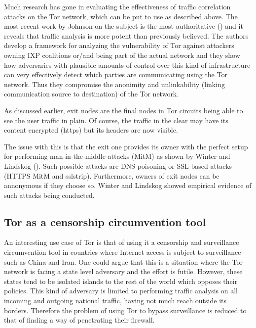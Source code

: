 \documentclass[11pt]{book} %
\begin{document}
Much research has gone in evaluating the effectiveness of traffic correlation attacks on the Tor network, which can be put to use as described above. The most recent work by Johnson on the subject is the most authoritative (\citep*{captainJohnson}) and it reveals that traffic analysis is more potent than previously believed. The authors develop a framework for analyzing the vulnerability of Tor against attackers owning IXP coalitions or/and being part of the actual network and they show how adversaries with plausible amounts of control over this kind of infrastructure can very effectively detect which parties are communicating using the Tor network. Thus they compromise the anonimity and unlinkability (linking communication source to destination) of the Tor network.


As discussed earlier, exit nodes are the final nodes in Tor circuits being able to see the user traffic in plain. Of course, the traffic in the clear may have its content encrypted (https) but its headers are now visible.

The issue with this is that the exit one provides its owner with the perfect setup for performing man-in-the-middle-attacks (MitM) as shown by Winter and Lindskog (\citep*{spoiledOnions}). Such possible attacks are DNS poisoning or SSL-based attacks (HTTPS MitM and sslstrip). Furthermore, owners of exit nodes can be annonymous if they choose so. Winter and Lindskog showed empirical evidence of such attacks being conducted.

\subsection{Tor as a censorship circumvention tool}

An interesting use case of Tor is that of using it a censorship and surveillance circumvention tool in countries where Internet access is subject to surveillance such as China and Iran. One could argue that this is a situation where the Tor network is facing a state level adversary and the effort is futile. However, these states tend to be isolated islands to the rest of the world which opposes their policies. This kind of adversary is limited to performing traffic analysis on all incoming and outgoing national traffic, having not much reach outside its borders. Therefore the problem of using Tor to bypass surveillance is reduced to that of finding a way of penetrating their firewall.
\end{document}
